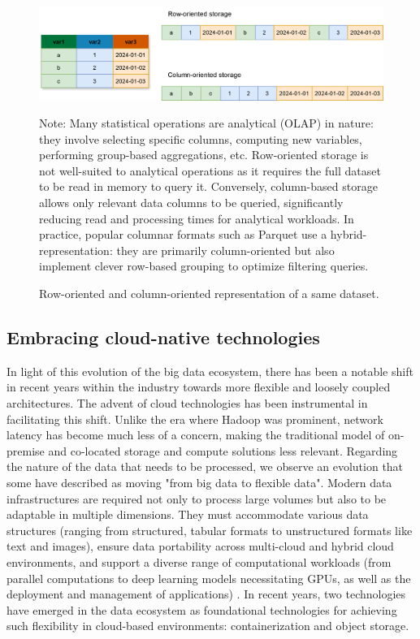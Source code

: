 \documentclass[graybox]{svmult}
\begin{document}
\begin{figure}[htbp]
    \includegraphics[width=\linewidth]{figures/columnar-storage.png}
    \caption{Row-oriented and column-oriented representation of a same dataset.}
    \label{fig:columnar-storage}
    \medskip
    {\footnotesize Note: Many statistical operations are analytical (OLAP) in nature: they involve selecting specific columns, computing new variables, performing group-based aggregations, etc. Row-oriented storage is not well-suited to analytical operations as it requires the full dataset to be read in memory to query it. Conversely, column-based storage allows only relevant data columns to be queried, significantly reducing read and processing times for analytical workloads. In practice, popular columnar formats such as Parquet use a hybrid-representation: they are primarily column-oriented but also implement clever row-based grouping to optimize filtering queries.}
\end{figure}

\subsection{Embracing cloud-native technologies}
\label{sec:cloud-native}

In light of this evolution of the big data ecosystem, there has been a notable shift in recent years within the industry towards more flexible and loosely coupled architectures. The advent of cloud technologies has been instrumental in facilitating this shift. Unlike the era where Hadoop was prominent, network latency has become much less of a concern, making the traditional model of on-premise and co-located storage and compute solutions less relevant. Regarding the nature of the data that needs to be processed, we observe an evolution that some have described as moving "from big data to flexible data". Modern data infrastructures are required not only to process large volumes but also to be adaptable in multiple dimensions. They must accommodate various data structures (ranging from structured, tabular formats to unstructured formats like text and images), ensure data portability across multi-cloud and hybrid cloud environments, and support a diverse range of computational workloads (from parallel computations to deep learning models necessitating GPUs, as well as the deployment and management of applications) \cite{li2020big}. In recent years, two technologies have emerged in the data ecosystem as foundational technologies for achieving such flexibility in cloud-based environments: containerization and object storage. 
\end{document}
